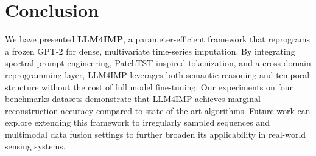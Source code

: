 \documentclass[conference]{IEEEtran}
\begin{document}
\section{Conclusion}
\label{sec:conclusion}
We have presented \textbf{LLM4IMP}, a parameter-efficient framework that reprograms a frozen GPT-2 for dense, multivariate time-series imputation. By integrating spectral prompt engineering, PatchTST-inspired tokenization, and a cross-domain reprogramming layer, LLM4IMP leverages both semantic reasoning and temporal structure without the cost of full model fine-tuning.
Our experiments on four benchmarks datasets demonstrate that LLM4IMP achieves marginal reconstruction accuracy compared to state-of-the-art algorithms.
Future work can explore extending this framework to irregularly sampled sequences and multimodal data fusion settings to further broaden its applicability in real-world sensing systems.



\end{document}
